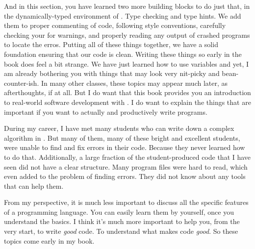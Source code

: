 And in this section, you have learned two more building blocks to do just that, in the dynamically-typed environment of \python.
Type checking and type hints.
We add them to proper commenting of code, following style conventions, carefully checking your  for warnings, and properly reading any output of crashed programs to locate the erros.
Putting all of these things together, we have a solid foundation ensuring that our code is clean.
Writing these things so early in the book does feel a bit strange.
We have just learned how to use variables and yet, I am already bothering you with things that may look very nit-picky and bean-counter-ish.
In many other classes, these topics may appear much later, as afterthoughts, if at all.
But I do want that this book provides you an introduction to real-world software development with \python.
I do want to explain the things that are important if you want to actually and productively write programs.

During my career, I have met many students who can write down a complex algorithm in \python.
But many of them, many of these bright and excellent students, were unable to find and fix errors in their code.
Because they never learned how to do that.
Additionally, a large fraction of the student-produced code that I have seen did not have a clear structure.
Many program files were hard to read, which even added to the problem of finding errors.
They did not know about any tools that can help them.

From my perspective, it is much less important to discuss all the specific features of a programming language.
You can easily learn them by yourself, once you understand the basics.
I think it's much more important to help you, from the very start, to write \emph{good} code.
To understand what makes code \emph{good}.
So these topics come early in my book.%
\endhsection%
\endhsection%
%
